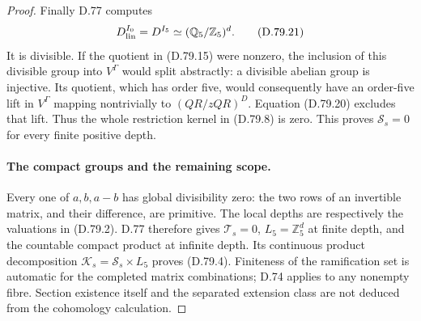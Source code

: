 \begin{proof}
Finally D.77 computes
\[
 D_{\rm lin}^{I_0}=D^{I_5}
                  \simeq(\mathbb Q_5/\mathbb Z_5)^d.   \tag{D.79.21}
\]
It is divisible. If the quotient in (D.79.15) were nonzero,
the inclusion of this divisible group into \(V^\Gamma\)
would split abstractly: a divisible abelian group is injective.
Its quotient, which has order five, would consequently have
an order-five lift in \(V^\Gamma\) mapping nontrivially to
\((QR/zQR)^D\). Equation (D.79.20) excludes that lift.
Thus the whole restriction kernel in (D.79.8) is zero.
This proves \(\mathcal S_s=0\) for every finite positive depth.

\paragraph{The compact groups and the remaining scope.}
Every one of \(a,b,a-b\) has global divisibility zero: the two
rows of an invertible matrix, and their difference, are
primitive. The local depths are respectively the valuations
in (D.79.2). D.77 therefore gives \(\mathcal T_s=0\),
\(L_5=\mathbb Z_5^d\) at finite depth, and the countable
compact product at infinite depth. Its continuous product
decomposition \(\mathcal K_s=\mathcal S_s\times L_5\)
proves (D.79.4). Finiteness of the ramification set is automatic
for the completed matrix combinations; D.74 applies to any
nonempty fibre. Section existence itself and the separated
extension class are not deduced from the cohomology calculation.
\end{proof}
